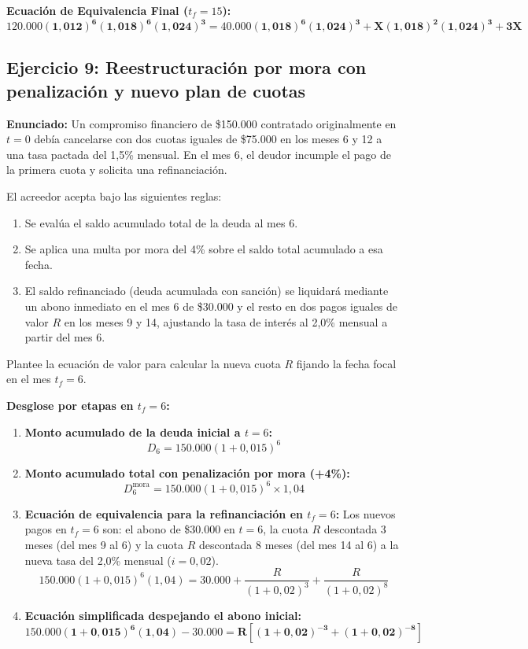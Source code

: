 \documentclass[11pt, a4paper]{article}
\begin{document}
\textbf{Ecuación de Equivalencia Final ($t_f = 15$):}
\[
\mathbf{120.000(1,012)^6 (1,018)^6 (1,024)^3 = 40.000(1,018)^6 (1,024)^3 + X(1,018)^2 (1,024)^3 + 3X}
\]

\vspace{0.2cm}

\subsection*{\color{secondary} Ejercicio 9: Reestructuración por mora con penalización y nuevo plan de cuotas}
\textbf{Enunciado:} Un compromiso financiero de \$150.000 contratado originalmente en $t=0$ debía cancelarse con dos cuotas iguales de \$75.000 en los meses 6 y 12 a una tasa pactada del 1,5\% mensual. En el mes 6, el deudor incumple el pago de la primera cuota y solicita una refinanciación. 

El acreedor acepta bajo las siguientes reglas:
\begin{enumerate}[label=\roman*)]
    \item Se evalúa el saldo acumulado total de la deuda al mes 6.
    \item Se aplica una multa por mora del 4\% sobre el saldo total acumulado a esa fecha.
    \item El saldo refinanciado (deuda acumulada con sanción) se liquidará mediante un abono inmediato en el mes 6 de \$30.000 y el resto en dos pagos iguales de valor $R$ en los meses 9 y 14, ajustando la tasa de interés al 2,0\% mensual a partir del mes 6.
\end{enumerate}
Plantee la ecuación de valor para calcular la nueva cuota $R$ fijando la fecha focal en el mes $t_f = 6$.

\textbf{Desglose por etapas en $t_f = 6$:}
\begin{enumerate}[label=\arabic*.]
    \item \textbf{Monto acumulado de la deuda inicial a $t=6$:}
    \[
    D_6 = 150.000(1 + 0,015)^6
    \]
    \item \textbf{Monto acumulado total con penalización por mora (+4\%):}
    \[
    D_6^{\text{mora}} = 150.000(1 + 0,015)^6 \times 1,04
    \]
    \item \textbf{Ecuación de equivalencia para la refinanciación en $t_f = 6$:}
    Los nuevos pagos en $t_f = 6$ son: el abono de \$30.000 en $t=6$, la cuota $R$ descontada 3 meses (del mes 9 al 6) y la cuota $R$ descontada 8 meses (del mes 14 al 6) a la nueva tasa del 2,0\% mensual ($i = 0,02$).
    \[
    150.000(1 + 0,015)^6 (1,04) = 30.000 + \frac{R}{(1 + 0,02)^3} + \frac{R}{(1 + 0,02)^8}
    \]
    \item \textbf{Ecuación simplificada despejando el abono inicial:}
    \[
    \mathbf{150.000(1 + 0,015)^6 (1,04) - 30.000 = R \left[ (1 + 0,02)^{-3} + (1 + 0,02)^{-8} \right]}
    \]
\end{enumerate}
\end{document}
